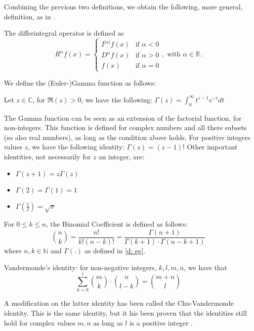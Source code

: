 Combining the previous two definitions, we obtain the following, more general, definition, as in \citet{oldham1974}.
\begin{definition}\label{d: differintegral}
    The differintegral operator is defined as
    \begin{equation}
        R^\alpha f(x) = \begin{cases}
            I^{|\alpha|} f(x) & \text{if } \alpha < 0 \\
            D^\alpha f(x) & \text{if } \alpha > 0 \\
            f(x) & \text{if } \alpha = 0
        \end{cases}, \text{ with } \alpha \in \mathbb{R}.
        \end{equation}
        
\end{definition}

We define the (Euler-)Gamma function as follows:
\begin{definition}\label{d: eg}
    Let \(z \in \mathbb{C}\), for \(\Re(z) > 0\), we have the following: \(\displaystyle \Gamma(z) = \int_{0}^{\infty} t^{z-1} e^{-t} dt\)
\end{definition}

The Gamma function can be seen as an extension of the factorial function, for non-integers. This function is defined for complex numbers and all there subsets (so also real numbers), as long as the condition above holds. For positive integers values \(z\), we have the following identity: \(\Gamma(z) = (z - 1)!\)
Other important identities, not necessarily for \(z\) an integer, are: 
\begin{itemize}
    \item \(\Gamma(z + 1) = z \Gamma(z)\)
    \item \(\Gamma(2) = \Gamma(1) = 1\)
    \item \(\Gamma(\frac{1}{2}) = \sqrt{\pi}\)
\end{itemize}


\begin{definition}\label{def:binomial}
    For \(0 \leq k \leq n\), the Binomial Coefficient is defined as follows: \[\binom{n}{k} = \frac{n!}{k! (n - k)!} = \frac{\Gamma(n + 1)}{\Gamma(k + 1) \cdot \Gamma( n - k  + 1)}\] where \(n, k \in \mathbb{N}\) and \(\Gamma(.)\) as defined in \ref{d: eg}.
\end{definition}


\begin{definition}\label{def:vandermonde}
    Vandermonde's identity: for non-negative integers, \(k, l, m, n\), we have that \[\sum_{k = 0}^{l} \binom{m}{k} \cdot \binom{n}{l - k} = \binom{m + n}{l}\]
\end{definition}
A modification on the latter identity has been called the Chu-Vandermonde identity. This is the same identity, but it his been proven that the identities still hold for complex values \(m, n\) as long as \(l\) is a positive integer \citep{askey75}.

